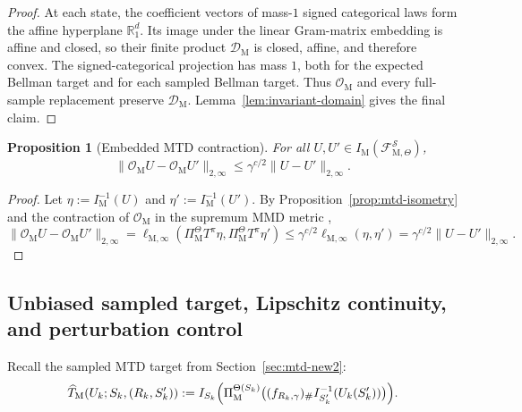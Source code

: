 \documentclass{article}
\newtheorem{proposition}[theorem]{Proposition}
\newcommand{\X}{\mathcal{S}}
\begin{document}
\begin{proof}
At each state, the coefficient vectors of mass-$1$ signed categorical laws form the affine hyperplane $\mathbb R_1^d$. Its image under the linear Gram-matrix embedding is affine and closed, so their finite product $\mathcal D_{\mathrm M}$ is closed, affine, and therefore convex. The signed-categorical projection has mass $1$, both for the expected Bellman target and for each sampled Bellman target. Thus $\mathcal O_{\mathrm M}$ and every full-sample replacement preserve $\mathcal D_{\mathrm M}$. Lemma~\ref{lem:invariant-domain} gives the final claim.
\end{proof}

\begin{proposition}[Embedded MTD contraction]
\label{prop:mtd-contraction-app}
For all $U,U'\in I_{\mathrm M}(\mathcal F^{\X}_{\mathrm M,\Theta})$,
\begin{equation}
\lVert \mathcal O_{\mathrm M}U-\mathcal O_{\mathrm M}U'\rVert_{2,\infty} \le \gamma^{c/2}\lVert U-U'\rVert_{2,\infty}.
\end{equation}
\end{proposition}

\begin{proof}
Let $\eta:=I_{\mathrm M}^{-1}(U)$ and $\eta':=I_{\mathrm M}^{-1}(U')$. By Proposition~\ref{prop:mtd-isometry} and the contraction of $\mathcal O_{\mathrm M}$ in the supremum MMD metric \citep{wiltzer2024foundations},
\begin{equation}
\lVert \mathcal O_{\mathrm M}U-\mathcal O_{\mathrm M}U'\rVert_{2,\infty} = \ell_{\mathrm M,\infty}(\Pi_{\mathrm M}^{\Theta}T^\pi\eta,\Pi_{\mathrm M}^{\Theta}T^\pi\eta') \le \gamma^{c/2}\ell_{\mathrm M,\infty}(\eta,\eta') = \gamma^{c/2}\lVert U-U'\rVert_{2,\infty}.
\end{equation}
\end{proof}

\subsection{Unbiased sampled target, Lipschitz continuity, and perturbation control}

Recall the sampled MTD target from Section~\ref{sec:mtd-new2}:
\begin{equation}
\widehat T_{\mathrm M}(U_k;S_k,(R_k,S'_k)) := I_{S_k} \Bigl( \Pi_{\mathrm M}^{\Theta(S_k)} \bigl( (f_{R_k,\gamma})_\# I_{S'_k}^{-1}(U_k(S'_k)) \bigr) \Bigr).
\end{equation}
\end{document}
